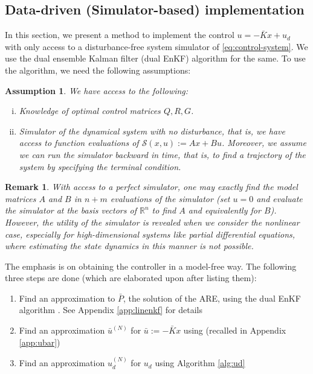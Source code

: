 \documentclass[letterpaper, 10 pt, conference]{ieeeconf}  %
\newtheorem{assumption}{Assumption}
\newtheorem{remark}{Remark}
\newcommand{\R}{\mathbb{R}}
\renewcommand{\S}{\mathcal{S}}
\newcommand{\todo}[1]{{\color{blue} #1}}
\begin{document}
\subsection{Data-driven (Simulator-based) implementation}
In this section, we present a method to implement the control $u = -\bar{K}x + u_d$ with only access to a disturbance-free system simulator of \eqref{eq:control-system}. We use the dual ensemble Kalman filter (dual EnKF) algorithm \cite{joshi-2022} for the same. To use the algorithm, we need the following assumptions:
\begin{assumption}
We have access to the following:
\begin{enumerate}[(i)]
\item Knowledge of optimal control matrices $Q,R,G$. %
\item Simulator of the dynamical system with no disturbance, that is, we have access to function evaluations of $\S(x,u) := Ax + Bu$. Moreover, we assume we can run the simulator backward in time, that is, to find a trajectory of the system by specifying the terminal condition. 
\end{enumerate}
\label{assn:access}
\end{assumption}
\begin{remark}
\label{rmk:evaluate}
With access to a perfect simulator, one may exactly find the model matrices $A$ and $B$ in $n+m$ evaluations of the simulator (set $u=0$ and evaluate the simulator at the basis vectors of $\R^n$ to find $A$ and equivalently for $B$). However, the utility of the simulator is revealed when we consider the nonlinear case, especially for high-dimensional systems like partial differential equations, where estimating the state dynamics in this manner is not possible. 
\end{remark}


The emphasis is on obtaining the controller in a model-free way. The following three steps are done (which are elaborated upon after listing them):
\begin{enumerate}
\item Find an approximation to $\bar{P}$, the solution of the ARE, using the dual EnKF algorithm \cite{joshi-2022}. See Appendix \ref{app:linenkf} for details
\item Find an approximation $\bar{u}^{(N)}$ for $\bar{u} := -\bar{K}x$ using \cite[Algorithm 2]{joshi-2022} (recalled in Appendix \ref{app:ubar})
\item Find an approximation $u_d^{(N)}$ for $u_d$ using Algorithm \ref{alg:ud}
\end{enumerate}
\end{document}

